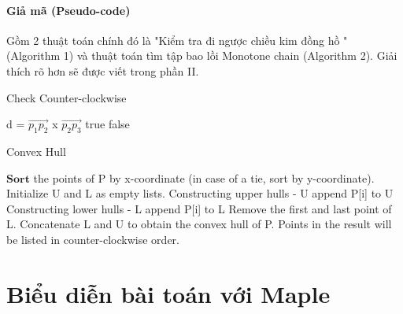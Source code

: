 \documentclass[12pt]{article}
\begin{document}
      \subsection{Giả mã (Pseudo-code)}
        Gồm 2 thuật toán chính đó là "Kiểm tra đi ngược chiều kim đồng hồ " (Algorithm 1) và thuật toán tìm tập bao lồi Monotone chain (Algorithm 2). Giải thích rõ hơn sẽ được viết trong phần II.
        \begin{algorithm}
          \caption{Check Counter-clockwise}
          \begin{algorithmic}[1]
              \State d = $\overrightarrow{p_1p_2}$ x $\overrightarrow{p_2p_3}$
               \Return true
              \Else \text{ } \Return false 
              \EndIf
            \EndProcedure
          \end{algorithmic}
        \end{algorithm}
        \begin{algorithm}
          \caption{Convex Hull}
          \begin{algorithmic}[1]
              \State $\textbf{Sort}$ the points of P by x-coordinate (in case of a tie, sort by y-coordinate).
              \State Initialize U and L as empty lists.
              \State Constructing upper hulls - U
                \EndWhile
                \State append P[i] to U
              \EndFor
              \State Constructing lower hulls - L
                \EndWhile
                \State append P[i] to L
              \EndFor  
              \State Remove the first and last point of L.
              \State Concatenate L and U to obtain the convex hull of P.
              \State Points in the result will be listed in counter-clockwise order.
            \EndProcedure
          \end{algorithmic}
        \end{algorithm}
  \newpage
  \part{Biểu diễn bài toán với Maple}
\end{document}
